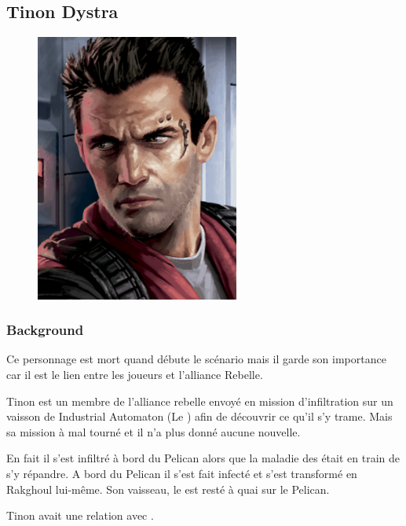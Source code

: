 \subsection{Tinon Dystra} \label{sec:tinon-dystra}
\begin{figure}[h!]
    \centering
    \includegraphics[height=250pt]{_img/dos-au-muur/tinon-dystra.png}
\end{figure}

\subsubsection{Background}
Ce personnage est mort quand débute le scénario mais il garde son importance car il est le lien entre les joueurs et l'alliance Rebelle.

Tinon est un membre de l'alliance rebelle envoyé en mission d'infiltration sur un vaisson de Industrial Automaton (Le ) afin de découvrir ce qu'il s'y trame. Mais sa mission à mal tourné et il n'a plus donné aucune nouvelle. 

En fait il s'est infiltré à bord du Pelican alors que la maladie des  était en train de s'y répandre. A bord du Pelican il s'est fait infecté et s'est transformé en Rakghoul lui-même. Son vaisseau, le  est resté à quai sur le Pelican.

Tinon avait une relation avec .

\newpage

